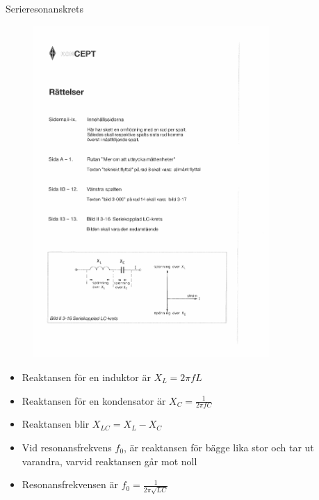 \documentclass{beamer}
\begin{document}
\begin{frame}{Serieresonanskrets}

\begin{figure}[h]
\includegraphics[width=0.8\textwidth]{images/bild_2_3-16}
\end{figure}

\begin{itemize}
  \item Reaktansen för en induktor är $X_L = 2\pi f L$
  \item Reaktansen för en kondensator är $X_C = \frac{1}{2\pi f C}$
  \item Reaktansen blir $X_{LC} = X_L - X_C$
  \item Vid resonansfrekvens $f_0$, är reaktansen för bägge lika stor och tar ut varandra, varvid reaktansen går mot noll
  \item Resonansfrekvensen är $f_0 = \frac{1}{2\pi\sqrt{LC}}$
  \end{itemize}
\end{frame}
\end{document}
